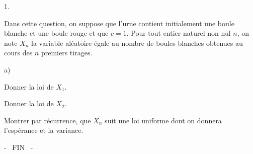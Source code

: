 \documentclass[11pt]{article}%
\begin{document}
\begin{noliste}{1.}
\item Dans cette question, on suppose que l'urne contient initialement
une
boule blanche et une boule rouge et que $c = 1$. Pour tout entier
naturel non
nul $n$, on note $X_{n}$ la variable aléatoire égale au nombre de
boules blanches obtenues au cours des $n$ premiers tirages.

\begin{noliste}{a)}
 \setlength{\itemsep}{2mm}
\item Donner la loi de $X_{1}$.

\item Donner la loi de $X_{2}$.

\item Montrer par récurrence, que $X_{n}$ suit une loi uniforme dont on
donnera l'espérance et la variance.
\end{noliste}
\end{noliste}

\begin{center}
- \ FIN \ -
\end{center}
\end{document}
